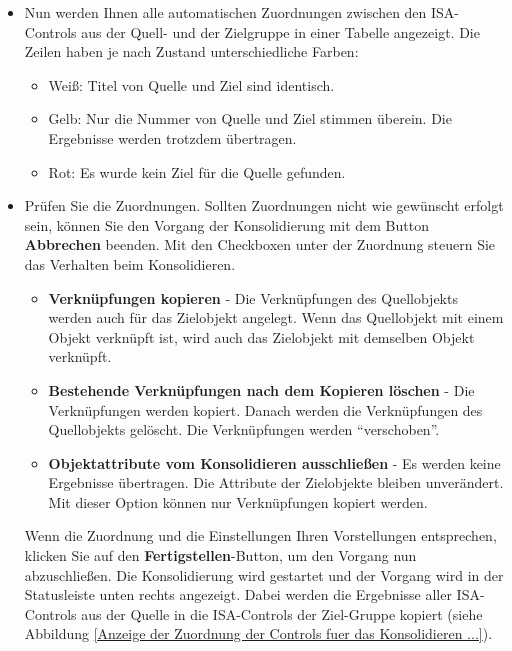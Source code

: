 \documentclass[a4paper,10pt]{book}
\begin{document}
\begin{itemize}
 \item Nun werden Ihnen alle automatischen Zuordnungen zwischen den ISA-Controls aus der Quell- und der Zielgruppe in einer Tabelle angezeigt. Die Zeilen haben je nach Zustand unterschiedliche Farben:
 \begin{itemize}
 \item Weiß: Titel von Quelle und Ziel sind identisch.
 \item Gelb: Nur die Nummer von Quelle und Ziel stimmen überein. Die Ergebnisse werden trotzdem übertragen.
 \item Rot: Es wurde kein Ziel für die Quelle gefunden.
\end{itemize}
 \item Prüfen Sie die Zuordnungen. Sollten Zuordnungen nicht wie gewünscht erfolgt sein, können Sie den Vorgang der Konsolidierung mit dem
Button \textbf{Abbrechen} beenden. Mit den Checkboxen unter der Zuordnung steuern Sie das Verhalten beim Konsolidieren.
\begin{itemize}
 \item \textbf{Verknüpfungen kopieren} - Die Verknüpfungen des Quellobjekts
 werden auch für das Zielobjekt angelegt. Wenn das Quellobjekt mit einem Objekt
 verknüpft ist, wird auch das Zielobjekt mit demselben Objekt verknüpft.
 \item \textbf{Bestehende Verknüpfungen nach dem Kopieren löschen} - Die
 Verknüpfungen werden kopiert. Danach werden die Verknüpfungen des Quellobjekts
 gelöscht. Die Verknüpfungen werden ``verschoben''.
 \item \textbf{Objektattribute vom Konsolidieren ausschließen} - Es werden keine
 Ergebnisse übertragen. Die Attribute der Zielobjekte bleiben unverändert. Mit
 dieser Option können nur Verknüpfungen kopiert werden.
\end{itemize}
Wenn die Zuordnung und die Einstellungen Ihren Vorstellungen entsprechen, klicken Sie auf den \textbf{Fertigstellen}-Button,
um den Vorgang nun abzuschließen. Die Konsolidierung wird gestartet und der Vorgang wird in der Statusleiste unten rechts angezeigt.
Dabei werden die Ergebnisse aller ISA-Controls aus der Quelle in die ISA-Controls der Ziel-Gruppe kopiert (siehe Abbildung \ref{Anzeige der Zuordnung der Controls fuer das Konsolidieren ...}).
\end{itemize}
\end{document}
